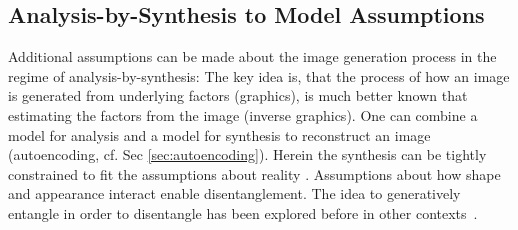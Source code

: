 	\subsection{Analysis-by-Synthesis to Model Assumptions}\label{sec:anabysyn}
		Additional assumptions can be made about the image generation process in the regime of analysis-by-synthesis:
		The key idea is, that the process of how an image is generated from underlying factors (graphics), is much better known that estimating the factors from the image (inverse graphics).
		One can combine a model for analysis and a model for synthesis to reconstruct an image (autoencoding, cf. Sec \ref{sec:autoencoding}).
		Herein the synthesis can be tightly constrained to fit the assumptions about reality \cite{tieleman14thesis}.
		Assumptions about how shape and appearance interact enable disentanglement. The idea to generatively entangle in order to disentangle has been explored before in other contexts~\cite{desjardins12genentangle}.

